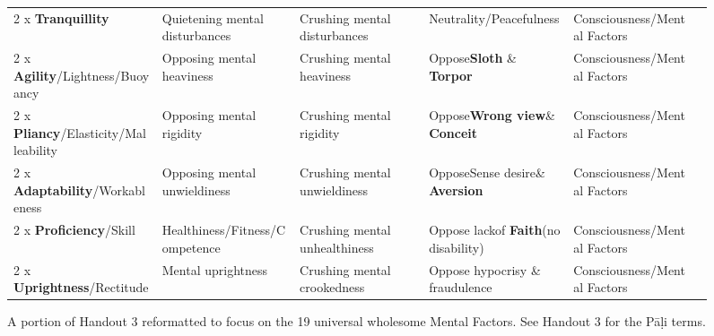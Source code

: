 \begin{figure} [H]
\begin{tabular}{P{0.25\textwidth} | C{.185\textwidth} C{0.185\textwidth} C{0.185\textwidth} C{0.195\textwidth} m{0mm}}
2 x \textbf{Tranquillity} & Quietening mental disturbances & Crushing mental disturbances & Neutrality/\newline Peacefulness & Consciousness/\newline Mental Factors &\\[9mm]
2 x \textbf{Agility}/\newline Lightness/Buoyancy & Opposing mental heaviness & Crushing mental heaviness & Oppose\newline \textbf{Sloth} \& \textbf{Torpor} & Consciousness/\newline Mental Factors &\\[9mm]
2 x \textbf{Pliancy}/\newline Elasticity/Malleability & Opposing mental rigidity & Crushing mental rigidity & Oppose\newline \textbf{Wrong view}\newline \& \textbf{Conceit} & Consciousness/\newline Mental Factors &\\[9mm]
2 x \textbf{Adaptability}/\newline Workableness & Opposing mental unwieldiness & Crushing mental unwieldiness & Oppose\newline Sense desire\newline \& \textbf{Aversion} & Consciousness/\newline Mental Factors &\\[9mm]
2 x \textbf{Proficiency}/\newline Skill & Healthiness/\newline Fitness/\newline Competence & Crushing mental unhealthiness & Oppose lack\newline of \textbf{Faith}\newline (no disability) & Consciousness/\newline Mental Factors &\\[9mm]
2 x \textbf{Uprightness}/\newline Rectitude & Mental uprightness & Crushing mental crookedness & Oppose hypocrisy \& fraudulence  & Consciousness/\newline Mental Factors &\\[9mm]
\bottomrule
\end{tabular} 

\caption{A portion of Handout 3 reformatted to focus on the 19 universal wholesome Mental Factors. See Handout 3 for the Pāḷi terms.}

\end{figure}

